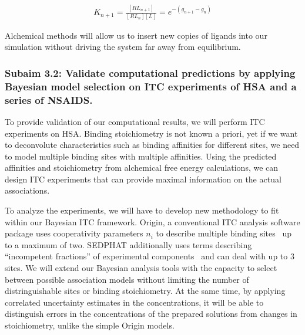 \documentclass[10pt,final]{article}
\begin{document}

\begin{align}
K_{n+1} = \frac{[RL_{n+1}]}{[RL_n][L]} = e^{-(g_{n+1}-g_n)}
\label{eq:K_eq}
\end{align}



Alchemical methods will allow us to insert new copies of ligands into our simulation without driving the system far away from equilibrium. 

\subsubsection*{Subaim 3.2: Validate computational predictions by applying Bayesian model selection on ITC  experiments of HSA and a series of NSAIDS.}
To provide validation of our computational results, we will perform ITC experiments on HSA.
%
Binding stoichiometry is not known a priori, yet if we want to deconvolute characteristics such as binding affinities for different sites, we need to model multiple binding sites with multiple affinities.
%
%
Using the predicted affinities and stoichiometry from alchemical free energy calculations, we can design ITC experiments that can provide maximal information on the actual associations. 
%

To analyze the experiments, we will have to develop new methodology to fit within our Bayesian ITC framework.
%
Origin, a conventional ITC analysis software package uses cooperativity parameters $n_i$ to describe multiple binding sites~\autocite{MicroCal2004a} up to a maximum of two.
%
SEDPHAT additionally uses terms describing ``incompetent fractions'' of experimental components~\autocite{Houtman2007a,Zhao2015b} and can deal with up to 3 sites.
%
We will extend our Bayesian analysis tools with the capacity to select between possible association models without limiting the number of distringuishable sites or binding stoichiometry.
%
At the same time, by applying correlated uncertainty estimates in the concentrations, it will be able to distinguish errors in the concentrations of the prepared solutions from changes in stoichiometry, unlike the simple Origin models. 
\end{document}
